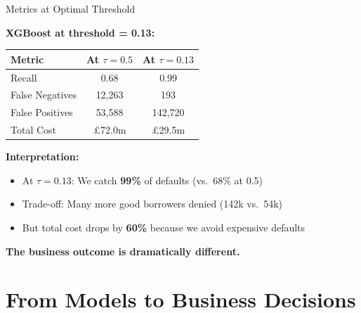 \documentclass[10pt]{beamer}
\newcommand{\highlight}[1]{\textcolor{AccentOrange}{\textbf{#1}}}
\begin{document}
\begin{frame}{Metrics at Optimal Threshold}

  \textbf{XGBoost at threshold = 0.13:}

  \vspace{0.5em}
  \begin{center}
  \begin{tabular}{lcc}
    \toprule
    \textbf{Metric} & \textbf{At $\tau = 0.5$} & \textbf{At $\tau = 0.13$} \\
    \midrule
    Recall & 0.68 & 0.99 \\
    False Negatives & 12,263 & 193 \\
    False Positives & 53,588 & 142,720 \\
    Total Cost & \pounds 72.0m & \pounds 29.5m \\
    \bottomrule
  \end{tabular}
  \end{center}

  \vspace{1em}
  \textbf{Interpretation:}
  \begin{itemize}
    \item At $\tau = 0.13$: We catch \highlight{99\%} of defaults (vs.\ 68\% at 0.5)
    \item Trade-off: Many more good borrowers denied (142k vs.\ 54k)
    \item But total cost drops by \highlight{60\%} because we avoid expensive defaults
  \end{itemize}

  \vspace{0.5em}
  \textbf{The business outcome is dramatically different.}
\end{frame}

\section{From Models to Business Decisions}
\end{document}
